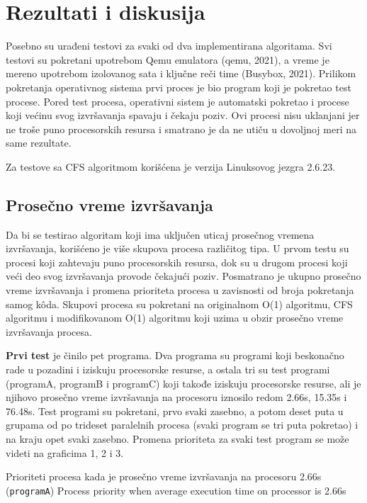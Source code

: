 \section{Rezultati i diskusija}

Posebno su urađeni testovi za svaki od dva implementirana algoritama. Svi testovi su pokretani upotrebom Qemu emulatora (qemu, 2021), a vreme je mereno upotrebom izolovanog sata i ključne reči time (Busybox, 2021). Prilikom pokretanja operativnog sistema prvi proces je bio program koji je pokretao test procese. Pored test procesa, operativni sistem je automatski pokretao i procese koji većinu svog izvršavanja spavaju i čekaju poziv. Ovi procesi nisu uklanjani jer ne troše puno procesorskih resursa i smatrano je da ne utiču u dovoljnoj meri na same rezultate.

Za testove sa CFS algoritmom korišćena je verzija Linuksovog jezgra 2.6.23.

\subsection{Prosečno vreme izvršavanja}

Da bi se testirao algoritam koji ima uključen uticaj prosečnog vremena izvršavanja, korišćeno je više skupova procesa različitog tipa. U prvom testu su procesi koji zahtevaju puno procesorskih resursa, dok su u drugom procesi koji veći deo svog izvršavanja provode čekajući poziv. Posmatrano je ukupno prosečno vreme izvršavanja i promena prioriteta procesa u zavisnosti od broja pokretanja samog kôda. Skupovi procesa su pokretani na originalnom O(1) algoritmu, CFS algoritmu i modifikovanom O(1) algoritmu koji uzima u obzir prosečno vreme izvršavanja procesa.

\textbf{Prvi test} je činilo pet programa. Dva programa su programi koji beskonačno rade u pozadini i iziskuju procesorske resurse, a ostala tri su test programi (programA, programB i programC) koji takođe iziskuju procesorske resurse, ali je njihovo prosečno vreme izvršavanja na procesoru iznosilo redom 2.66s, 15.35s i 76.48s. Test programi su pokretani, prvo svaki zasebno, a potom deset puta u grupama od po trideset paralelnih procesa (svaki program se tri puta pokretao) i na kraju opet svaki zasebno. Promena prioriteta za svaki test program se može videti na graficima 1, 2 i 3. 



    {Prioriteti procesa kada je prosečno vreme izvršavanja na procesoru 2.66s (\texttt{programA})}
    {Process priority when average execution time on processor is 2.66s}


